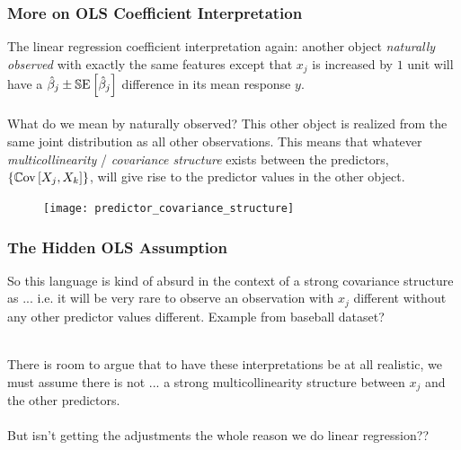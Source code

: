 \documentclass[slides]{beamer} %
\begin{document}
\begin{frame}\frametitle{More on OLS Coefficient Interpretation}

\small
The linear regression coefficient interpretation again: another object \emph{naturally observed} with exactly the same features except that $x_j$ is increased by $1$ unit will have a $\hat{\beta}_j \pm \mathbb{S}\text{E}\left[\hat{\beta}_j\right]$ difference in its mean response $y$.\\~\\

What do we mean by naturally observed? \pause This other object is realized from the same joint distribution as all other observations. This means that whatever \textit{multicollinearity} / \textit{covariance structure} exists between the predictors, $\left\{\mathbb{C}\text{ov}\left[X_j, X_k\right]\right\}$, will give rise to the predictor values in the other object.
	
\begin{figure}
\centering
\texttt{[image: predictor\_covariance\_structure]}
\end{figure}

\end{frame}

\begin{frame}\frametitle{The Hidden  OLS Assumption}

So this language  is \pause kind of absurd in the context of a strong covariance structure as ... \pause i.e. it will be very rare to observe an observation with $x_j$ different without any other predictor values different. Example from baseball dataset? \\~\\ \pause 

There is room to argue that to have these interpretations be at all realistic, we must assume there is not ... \pause  a strong multicollinearity structure between $x_j$ and the other predictors. \pause \\~\\

But isn't getting the adjustments the whole reason we do linear regression??
	
\end{frame}
\end{document}
